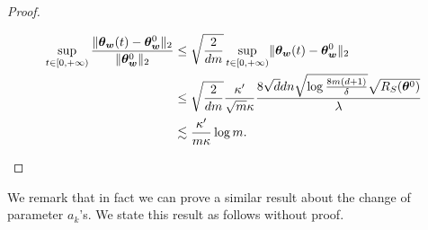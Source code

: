 \documentclass[twoside,11pt]{article}
\begin{document}
\begin{proof}
\begin{enumerate}[(a)]
\begin{equation*}
\begin{aligned}
                      \sup\limits_{t\in[0,+\infty)}\frac{\lVert\bm{\theta}_{\bm{w}}(t)-\bm{\theta}_{\bm{w}}^0\rVert_2}{\lVert\bm{\theta}_{\bm{w}}^0\rVert_2}
                       & \leq \sqrt{\frac{2}{dm}}\sup\limits_{t\in[0,+\infty)}\lVert\bm{\theta}_{\bm{w}}(t)-\bm{\theta}_{\bm{w}}^0\rVert_2                                           \\
                       & \leq  \sqrt{\frac{2}{dm}}\frac{\kappa'}{\sqrt{m}\kappa}\frac{8\sqrt{d}dn\sqrt{\log\frac{8m(d+1)}{\delta}}\sqrt{R_S(\bm{\theta}^0)}}{\lambda} \\
                       & \lesssim \frac{\kappa'}{m\kappa}\log m.
                  \end{aligned}
              \end{equation*}
    \end{enumerate}
\end{proof}
We remark that in fact we can prove a similar result about the change of parameter $a_k$'s. We state this result as follows without proof.
\end{document}
